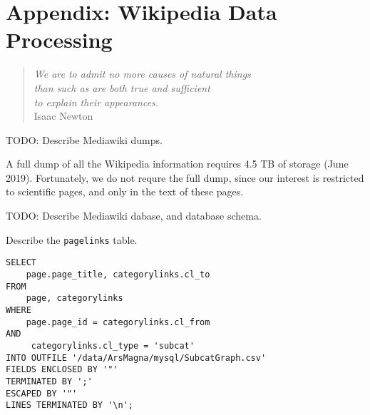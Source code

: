 %
%


\chapter{Appendix: Wikipedia Data Processing}
\label{apx:wikipedia}

\begin{quote}
\begin{flushright}
\emph{We are to admit no more causes of natural things \\
than such as are both true and sufficient \\
to explain their appearances.}\\
Isaac Newton
\end{flushright}
\end{quote}
\bigskip

{\color{red} TODO: Describe Mediawiki dumps.}

A full dump of all the Wikipedia information requires 4.5 TB of storage (June 2019). Fortunately, we do not requre the full dump, since our interest is restricted to scientific pages, and only in the text of these pages.

{\color{red} TODO: Describe Mediawiki dabase, and database schema.}

{\color{red} Describe the \texttt{pagelinks} table.}

\begin{sourcecode}
{\scriptsize \begin{verbatim}
SELECT
    page.page_title, categorylinks.cl_to
FROM
    page, categorylinks
WHERE
    page.page_id = categorylinks.cl_from
AND
     categorylinks.cl_type = 'subcat'
INTO OUTFILE '/data/ArsMagna/mysql/SubcatGraph.csv'
FIELDS ENCLOSED BY '"'
TERMINATED BY ';'
ESCAPED BY '"'
LINES TERMINATED BY '\n';
\end{verbatim}}
\end{sourcecode}




